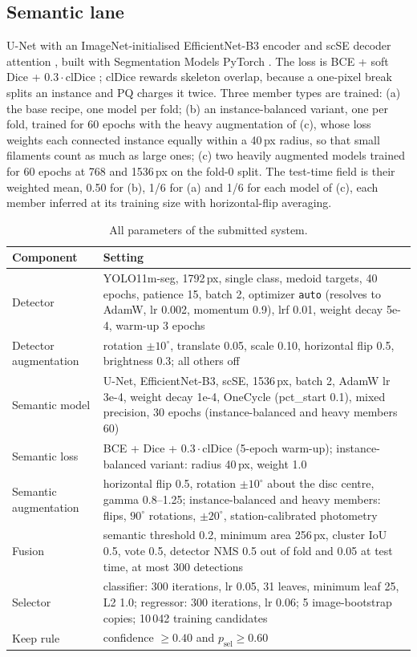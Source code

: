 \documentclass[sigconf]{acmart}
\begin{document}
\subsection{Semantic lane}
U-Net \cite{ronneberger2015unet} with an ImageNet-initialised \cite{deng2009imagenet} EfficientNet-B3 encoder \cite{tan2019efficientnet} and scSE decoder attention \cite{roy2018scse}, built with Segmentation Models PyTorch \cite{smp}. The loss is BCE + soft Dice + $0.3\cdot$clDice \cite{shit2021cldice}; clDice rewards skeleton overlap, because a one-pixel break splits an instance and PQ charges it twice. Three member types are trained: (a) the base recipe, one model per fold; (b) an instance-balanced variant, one per fold, trained for 60 epochs with the heavy augmentation of (c), whose loss weights each connected instance equally within a 40\,px radius, so that small filaments count as much as large ones; (c) two heavily augmented models trained for 60 epochs at 768 and 1536\,px on the fold-0 split. The test-time field is their weighted mean, 0.50 for (b), 1/6 for (a) and 1/6 for each model of (c), each member inferred at its training size with horizontal-flip averaging.

\begin{table}[t]
  \caption{All parameters of the submitted system.}
  \label{tab:params}
  \small
  \begin{tabular}{@{}p{}p{}@{}}
    \toprule
    Component & Setting \\
    \midrule
    Detector & YOLO11m-seg, 1792\,px, single class, medoid targets, 40 epochs, patience 15, batch 2, optimizer \texttt{auto} (resolves to AdamW, lr 0.002, momentum 0.9), lrf 0.01, weight decay 5e-4, warm-up 3 epochs \\
    Detector augmentation & rotation $\pm10^\circ$, translate 0.05, scale 0.10, horizontal flip 0.5, brightness 0.3; all others off \\
    Semantic model & U-Net, EfficientNet-B3, scSE, 1536\,px, batch 2, AdamW lr 3e-4, weight decay 1e-4, OneCycle (pct\_start 0.1), mixed precision, 30 epochs (instance-balanced and heavy members 60) \\
    Semantic loss & BCE + Dice + $0.3\cdot$clDice (5-epoch warm-up); instance-balanced variant: radius 40\,px, weight 1.0 \\
    Semantic augmentation & horizontal flip 0.5, rotation $\pm10^\circ$ about the disc centre, gamma 0.8--1.25; instance-balanced and heavy members: flips, $90^\circ$ rotations, $\pm20^\circ$, station-calibrated photometry \\
    Fusion & semantic threshold 0.2, minimum area 256\,px, cluster IoU 0.5, vote 0.5, detector NMS 0.5 out of fold and 0.05 at test time, at most 300 detections \\
    Selector & classifier: 300 iterations, lr 0.05, 31 leaves, minimum leaf 25, L2 1.0; regressor: 300 iterations, lr 0.06; 5 image-bootstrap copies; 10\,042 training candidates \\
    Keep rule & confidence $\geq 0.40$ and $p_\mathrm{sel}\geq 0.60$ \\
    \bottomrule
  \end{tabular}
\end{table}
\end{document}
